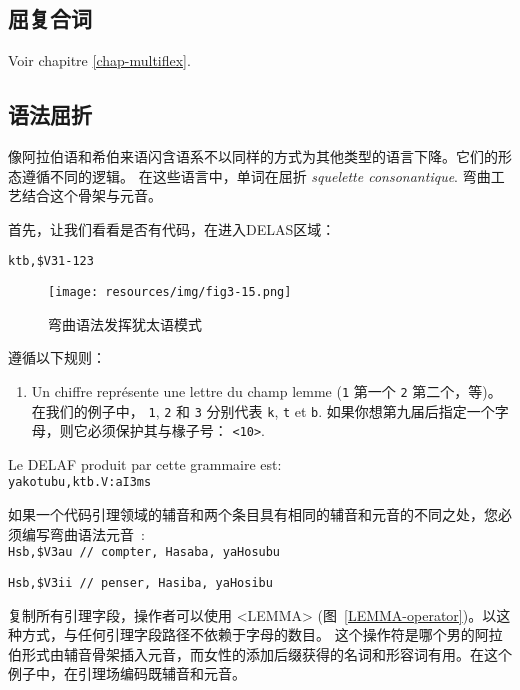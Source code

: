 \subsection{屈复合词}
Voir chapitre \ref{chap-multiflex}.

\subsection{语法屈折}
\label{subsection-semitic-inflection}
像阿拉伯语和希伯来语闪含语系不以同样的方式为其他类型的语言下降。它们的形态遵循不同的逻辑。
在这些语言中，单词在屈折 \textit{squelette consonantique}. 弯曲工艺结合这个骨架与元音。

\bigskip
\noindent 首先，让我们看看是否有代码，在进入DELAS区域：

\bigskip
\noindent \verb+ktb,$V31-123+

\bigskip
\begin{figure}[!ht]
\begin{center}
\texttt{[image: resources/img/fig3-15.png]}
\caption{弯曲语法发挥犹太语模式\label{semitic-grammar}}
\end{center}
\end{figure}

\bigskip
\noindent 遵循以下规则：
\begin{enumerate}
 (\verb+L+, \verb+R+, etc.).
\item Un chiffre représente une lettre du champ lemme (\verb+1+ 第一个
\verb+2+ 第二个，等)。在我们的例子中， \verb+1+, \verb+2+ 和 \verb+3+ 分别代表 \verb+k+, \verb+t+ et \verb+b+. 如果你想第九届后指定一个字母，则它必须保护其与椽子号： \verb+<10>+.
\end{enumerate}  

\bigskip
\noindent Le DELAF produit par cette grammaire est:\\ 
  
\verb+yakotubu,ktb.V:aI3ms+

\bigskip
\noindent 如果一个代码引理领域的辅音和两个条目具有相同的辅音和元音的不同之处，您必须编写弯曲语法元音~:\\ 

\verb+Hsb,$V3au	// compter, Hasaba, yaHosubu+

\verb+Hsb,$V3ii	// penser, Hasiba, yaHosibu+

\bigskip
\noindent 复制所有引理字段，操作者可以使用 <LEMMA> (图~\ref{LEMMA-operator})。以这种方式，与任何引理字段路径不依赖于字母的数目。
这个操作符是哪个男的阿拉伯形式由辅音骨架插入元音，而女性的添加后缀获得的名词和形容词有用。在这个例子中，在引理场编码既辅音和元音。

